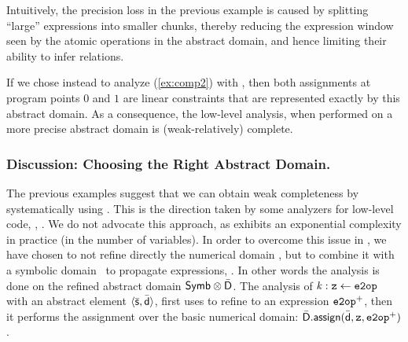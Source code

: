 \documentclass{llncs}
\begin{document}
Intuitively, the precision loss in the previous example is caused by
splitting ``large'' expressions into smaller chunks, thereby
reducing the expression window seen by the atomic operations in the
abstract domain, and hence limiting their ability to infer relations.

If we chose instead to analyze (\ref{ex:comp2}) with \Polyhedra, then
both assignments at program points $0$ and $1$ are linear
constraints that are represented exactly by this abstract domain.
As a consequence, the low-level analysis, when performed on a more
precise abstract domain is (weak-relatively) complete.

\subsubsection{Discussion: Choosing the Right Abstract Domain.}
The previous examples suggest that we can obtain weak completeness by
systematically using \Polyhedra. This is the direction taken by some
analyzers for low-level code, \eg,
\cite{GopanReps06,MendezNavasHermenegildo07,boogie}. We do not
advocate this approach, as \Polyhedra{} exhibits an exponential
complexity in practice (in the number of variables).  In order to
overcome this issue in \Clousot{}, we have chosen to not refine
directly the numerical domain , but to combine it with a
symbolic domain \Symbolic\ to propagate expressions,
\cite{AhoSethiUllman,Mine06}. 
In other words the analysis is done on the refined abstract domain $\mathsf{Symb} \otimes \bar{\mathsf{D}}$.  The
analysis of $\mathit{k} : \mathtt{z} \leftarrow \mathtt{e2op}$ with an
abstract element $\langle \bar{\mathsf{s}}, \bar{\mathsf{d}} \rangle$, first uses  to
refine  to an expression $\mathtt{e2op}^+$, then it performs
the assignment over the basic numerical domain: $\bar{\mathsf{D}}.\mathsf{\mathsf{assign}}(\bar{\mathsf{d}}, \mathtt{z}, \mathtt{e2op}^+)$.
\end{document}
